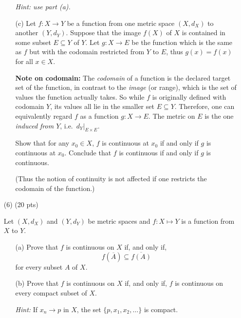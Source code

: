 \documentclass[12pt]{amsart}
\theoremstyle{definition}
\theoremstyle{remark}
\begin{document}
\begin{CJK}{UTF8}{bkai}
\begin{enumerate}
\begin{enumerate}
\emph{Hint: use part (a).}
 
 \item[(c)] 
Let $f : X \to Y$ be a function from one metric space $(X,d_X)$ to another $(Y,d_Y)$.  
Suppose that the image $f(X)$ of $X$ is contained in some subset $E \subseteq Y$ of $Y$.  
Let $g : X \to E$ be the function which is the same as $f$ but with the codomain restricted from $Y$ to $E$, thus $g(x) = f(x)$ for all $x \in X$.  

\medskip
\textbf{Note on codomain:}  
The \emph{codomain} of a function is the declared target set of the function, in contrast to the \emph{image} (or range), which is the set of values the function actually takes.  
So while $f$ is originally defined with codomain $Y$, its values all lie in the smaller set $E \subseteq Y$.  
Therefore, one can equivalently regard $f$ as a function $g : X \to E$.  
The metric on $E$ is the one \emph{induced from $Y$}, i.e.\ $d_Y|_{E \times E}$.

\medskip
Show that for any $x_0 \in X$, $f$ is continuous at $x_0$ if and only if $g$ is continuous at $x_0$.  
Conclude that $f$ is continuous if and only if $g$ is continuous.  

(Thus the notion of continuity is not affected if one restricts the codomain of the function.)

\end{enumerate}

\bigskip

\item[(6)]  (20 pts) 

Let $(X,d_X)$ and $(Y,d_Y)$ be metric spaces and $f:X \mapsto Y$ is a function from $X$ to $Y$.
\begin{enumerate}

  \item[(a)] 
  Prove that $f$ is continuous on $X$ if, and only if,
\[
f(\overline{A}) \subseteq \overline{f(A)}
\]
for every subset $A$ of $X$.

  \item[(b)]  Prove that $f$ is continuous on $X$ if, and only if, $f$ is continuous on every compact subset of $X$.  

\textit{Hint:} If $x_n \to p$ in $X$, the set $\{p, x_1, x_2, \dots \}$ is compact.

 \end{enumerate}

\vfill





\end{enumerate}



\end{CJK}
\end{document}
